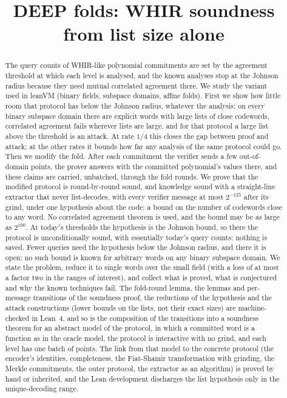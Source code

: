 \documentclass[11pt]{article}
\title{\bf DEEP folds: WHIR soundness from list size alone}
\author{}
\date{}
\begin{document}
\maketitle

\begin{abstract}
The query counts of WHIR-like polynomial commitments are set by the agreement threshold at which each level is analysed, and the known analyses stop at the Johnson radius because they need mutual correlated agreement there. We study the variant used in leanVM (binary fields, subspace domains, affine folds). First we show how little room that protocol has below the Johnson radius, whatever the analysis: on every binary subspace domain there are explicit words with large lists of close codewords, correlated agreement fails wherever lists are large, and for that protocol a large list above the threshold is an attack. At rate $1/4$ this closes the gap between proof and attack; at the other rates it bounds how far any analysis of the same protocol could go. Then we modify the fold. After each commitment the verifier sends a few out-of-domain points, the prover answers with the committed polynomial's values there, and these claims are carried, unbatched, through the fold rounds. We prove that the modified protocol is round-by-round sound, and knowledge sound with a straight-line extractor that never list-decodes, with every verifier message at most $2^{-125}$ after its grind, under one hypothesis about the code: a bound on the number of codewords close to any word. No correlated agreement theorem is used, and the bound may be as large as $2^{100}$. At today's thresholds the hypothesis is the Johnson bound, so there the protocol is unconditionally sound, with essentially today's query counts: nothing is saved. Fewer queries need the hypothesis below the Johnson radius, and there it is open: no such bound is known for arbitrary words on any binary subspace domain. We state the problem, reduce it to single words over the small field (with a loss of at most a factor two in the ranges of interest), and collect what is proved, what is conjectured and why the known techniques fail. The fold-round lemma, the lemmas and per-message transitions of the soundness proof, the reductions of the hypothesis and the attack constructions (lower bounds on the lists, not their exact sizes) are machine-checked in Lean~4, and so is the composition of the transitions into a soundness theorem for an abstract model of the protocol, in which a committed word is a function as in the oracle model, the protocol is interactive with no grind, and each level has one batch of points. The link from that model to the concrete protocol (the encoder's identities, completeness, the Fiat-Shamir transformation with grinding, the Merkle commitments, the outer protocol, the extractor as an algorithm) is proved by hand or inherited, and the Lean development discharges the list hypothesis only in the unique-decoding range.
\end{abstract}
\end{document}
